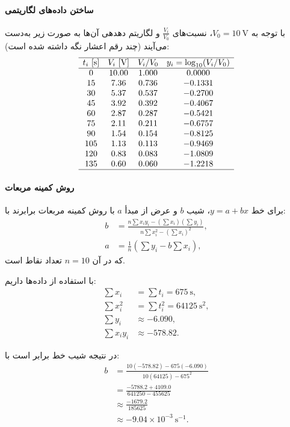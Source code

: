 \documentclass[a4paper, 11pt]{article}
\begin{document}
\paragraph{ساختن داده‌های لگاریتمی}
با توجه به $V_0 = 10~\mathrm{V}$، نسبت‌های $\frac{V_i}{V_0}$ و لگاریتم دهدهی آن‌ها به صورت زیر به‌دست می‌آیند (چند رقم اعشار نگه داشته شده است):
\[
\begin{array}{c c c c}
\hline
t_i~[\mathrm{s}] & V_i~[\mathrm{V}] & V_i/V_0 & y_i=\log_{10}(V_i/V_0) \\
\hline
0   & 10.00 & 1.000 &  0.0000 \\
15  &  7.36 & 0.736 & -0.1331 \\
30  &  5.37 & 0.537 & -0.2700 \\
45  &  3.92 & 0.392 & -0.4067 \\
60  &  2.87 & 0.287 & -0.5421 \\
75  &  2.11 & 0.211 & -0.6757 \\
90  &  1.54 & 0.154 & -0.8125 \\
105 &  1.13 & 0.113 & -0.9469 \\
120 &  0.83 & 0.083 & -1.0809\\
135 &  0.60 & 0.060 & -1.2218\\
\hline
\end{array}
\]

\paragraph{روش کمینه مربعات}

برای خط $y = a + bx$، شیب $b$ و عرض از مبدأ $a$ با روش کمینه مربعات برابرند با:
\begin{align}
b &=
\frac{n\sum x_i y_i - \left(\sum x_i\right)\left(\sum y_i\right)}
     {n\sum x_i^2 - \left(\sum x_i\right)^2},\\[2mm]
a &= \frac{1}{n}\left(\sum y_i - b\sum x_i\right),
\end{align}
که در آن $n=10$ تعداد نقاط است.

با استفاده از داده‌ها داریم:
\begin{align}
\sum x_i &= \sum t_i = 675~\mathrm{s},\\
\sum x_i^2 &= \sum t_i^2 = 64125~\mathrm{s^2},\\
\sum y_i &\approx -6.090,\\
\sum x_i y_i &\approx -578.82.
\end{align}

در نتیجه شیب خط برابر است با:
\begin{align}
b &=
\frac{10(-578.82) - 675(-6.090)}
     {10(64125) - 675^2} \\[1mm]
&=
\frac{-5788.2 + 4109.0}{641250 - 455625} \\[1mm]
&\approx \frac{-1679.2}{185625} \\[1mm]
&\approx -9.04\times 10^{-3}\ \mathrm{s^{-1}}.
\end{align}
\end{document}

